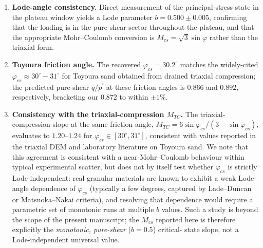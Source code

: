 \documentclass[11pt,a4paper]{article}
\begin{document}
\begin{enumerate}[leftmargin=*,label=(\arabic*),topsep=2pt,itemsep=3pt]
  \item \textbf{Lode-angle consistency.} Direct measurement of the
    principal-stress state in the plateau window yields a
    Lode parameter $b=0.500\pm 0.005$, confirming that the loading
    is in the pure-shear sector throughout the plateau, and that the
    appropriate Mohr--Coulomb conversion is
    $M_{cs}=\sqrt{3}\sin\varphi$ rather than the triaxial form.

  \item \textbf{Toyoura friction angle.} The recovered
    $\varphi_{cs}=30.2^{\circ}$ matches the widely-cited
    $\varphi_{cs}\approx 30^{\circ}\!-\!31^{\circ}$ for Toyoura sand
    obtained from drained triaxial compression; the predicted
    pure-shear $q/p^{\prime}$ at these friction angles is $0.866$
    and $0.892$, respectively, bracketing our $0.872$ to within
    $\pm 1\%$.

  \item \textbf{Consistency with the triaxial-compression
    $M_{TC}$.} The triaxial-compression slope at the same friction
    angle, $M_{TC}=6\sin\varphi_{cs}/(3-\sin\varphi_{cs})$, evaluates
    to $1.20$--$1.24$ for $\varphi_{cs}\in[30^{\circ},31^{\circ}]$,
    consistent with values reported in the triaxial DEM and
    laboratory literature on Toyoura sand. We note that this
    agreement is consistent with a near-Mohr--Coulomb behaviour
    within typical experimental scatter, but does not by itself
    test whether $\varphi_{cs}$ is strictly Lode-independent: real
    granular materials are known to exhibit a weak Lode-angle
    dependence of $\varphi_{cs}$ (typically a few degrees, captured
    by Lade--Duncan or Matsuoka--Nakai criteria), and resolving that
    dependence would require a parametric set of monotonic runs at
    multiple $b$ values. Such a study is beyond the scope of the
    present manuscript; the $M_{cs}$ reported here is therefore
    explicitly the \emph{monotonic, pure-shear} ($b=0.5$) critical-
    state slope, not a Lode-independent universal value.
\end{enumerate}
\end{document}
